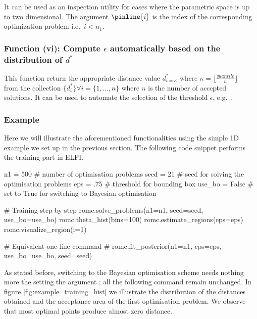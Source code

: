 It can be used as an inspection utility for cases where the parametric
space is up to two dimensional. The argument $\pinline{i}$ is the
index of the corresponding optimization problem i.e.\ $i<n_1$.

\subsubsection*{Function (vi): Compute $\epsilon$ automatically based on the distribution of $d^*$}

\vspace{5mm}
\noindent

\noindent
This function return the appropriate distance value $d_{i=\kappa}^*$
where $\kappa = \lfloor \frac{quantile}{n} \rfloor$ from the
collection $\{ d_i^* \} \forall i = \{1, \ldots, n\}$ where $n$ is the
number of accepted solutions. It can be used to automate the selection
of the threshold $\epsilon$, e.g.\
.


\subsubsection*{Example}

Here we will illustrate the aforementioned functionalities using the
simple 1D example we set up in the previous section. The following
code snippet performs the training part in ELFI.

\begin{pythoncode}
  n1 = 500 # number of optimisation problems
  seed = 21 # seed for solving the optimisation problems
  eps = .75 # threshold for bounding box
  use_bo = False # set to True for switching to Bayesian optimisation

  # Training step-by-step
  romc.solve_problems(n1=n1, seed=seed, use_bo=use_bo)
  romc.theta_hist(bins=100)
  romc.estimate_regions(eps=eps)
  romc.visualize_region(i=1)

  # Equivalent one-line command
  # romc.fit_posterior(n1=n1, eps=eps, use_bo=use_bo, seed=seed)
\end{pythoncode}

As stated before, switching to the Bayesian optimisation scheme needs
nothing more the setting the argument \pinline{use_bo=True}; all the
following command remain unchanged. In figure
\ref{fig:example_training_hist} we illustrate the distribution of the
distances obtained and the acceptance area of the first optimisation
problem. We observe that most optimal points produce almost zero
distance.


